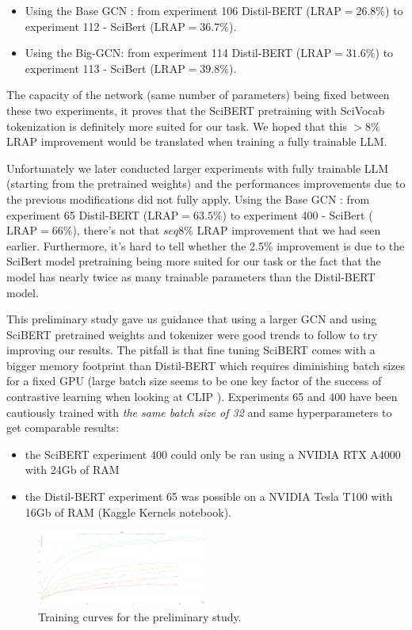 \begin{itemize}
    \item Using the Base GCN : from experiment 106 Distil-BERT ($\text{LRAP}=26.8\%$) to experiment 112 - SciBert ($\text{LRAP}=36.7\%$).
    \item Using the Big-GCN: from experiment 114 Distil-BERT ($\text{LRAP}=31.6\%$) to experiment 113 - SciBert ($\text{LRAP}=39.8\%$).
\end{itemize}
The capacity of the network (same number of parameters) being fixed between these two experiments, it proves that the SciBERT pretraining with SciVocab tokenization is definitely more suited for our task. We hoped that this $> 8\%$ LRAP improvement would be translated when training a fully trainable LLM.

Unfortunately we later conducted larger experiments with fully trainable LLM (starting from the pretrained weights) and the performances improvements due to the previous modifications did not fully apply. Using the Base GCN : from experiment 65 Distil-BERT ($\text{LRAP}=63.5\%$) to experiment 400 - SciBert ($\text{LRAP}=66\%$), there's not that $seq 8\%$ LRAP improvement that we had seen earlier. Furthermore, it's hard to tell whether the 2.5\% improvement is due to the SciBert model pretraining being more suited for our task or the fact that the model has nearly twice as many trainable parameters than the Distil-BERT model. 

This preliminary study gave us guidance that using a larger GCN and using SciBERT pretrained weights and tokenizer were good trends to follow to try improving our results. The pitfall is that fine tuning SciBERT comes with a bigger memory footprint than Distil-BERT which requires diminishing batch sizes for a fixed GPU (large batch size seems to be one key factor of the success of contrastive learning when looking at CLIP \cite{CLIP}). Experiments 65 and 400 have been cautiously trained with \textit{the same batch size of 32} and same hyperparameters to get comparable results: 
\begin{itemize}
    \item the SciBERT experiment 400 could only be ran using a NVIDIA RTX A4000 with 24Gb of RAM
    \item the Distil-BERT experiment 65 was possible on a NVIDIA Tesla T100 with 16Gb of RAM (Kaggle Kernels notebook).
\end{itemize}



\begin{figure}[ht]
    \centering
    \includegraphics[width=0.5\textwidth]{figures/preliminary_study.png}
    \caption{Training curves for the preliminary study.}
    \label{fig:preliminary_study_curves}
\end{figure}


